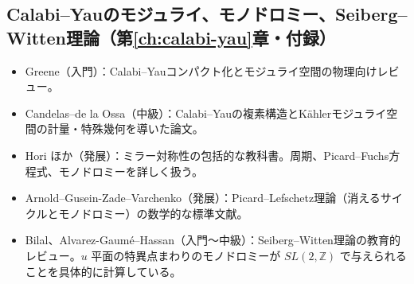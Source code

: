 \documentclass[uplatex, dvipdfmx, book]{jsbook}
\let\origsubsection\subsection
\let\origsubsubsection\subsubsection
\renewcommand{\section}{\origsubsection}
\renewcommand{\subsection}{\origsubsubsection}
\renewcommand{\subsubsection}{\paragraph}
\begin{document}
\section*{Calabi--Yauのモジュライ、モノドロミー、Seiberg--Witten理論（第\ref{ch:calabi-yau}章・付録）}
\begin{itemize}
    \item Greene\cite{greenestringtheorycalabiyau1997}（入門）：Calabi--Yauコンパクト化とモジュライ空間の物理向けレビュー。
    \item Candelas--de la Ossa\cite{candelasdelaossa1991}（中級）：Calabi--Yauの複素構造とK\"ahlerモジュライ空間の計量・特殊幾何を導いた論文。
    \item Hori ほか\cite{hori2003}（発展）：ミラー対称性の包括的な教科書。周期、Picard--Fuchs方程式、モノドロミーを詳しく扱う。
    \item Arnold--Gusein-Zade--Varchenko\cite{arnold1988}（発展）：Picard--Lefschetz理論（消えるサイクルとモノドロミー）の数学的な標準文献。
    \item Bilal\cite{bilal1996}、Alvarez-Gaum\'e--Hassan\cite{alvarezgaumehassan1997}（入門〜中級）：Seiberg--Witten理論の教育的レビュー。$u$ 平面の特異点まわりのモノドロミーが $SL(2,\mathbb{Z})$ で与えられることを具体的に計算している。
\end{itemize}



\end{document}
